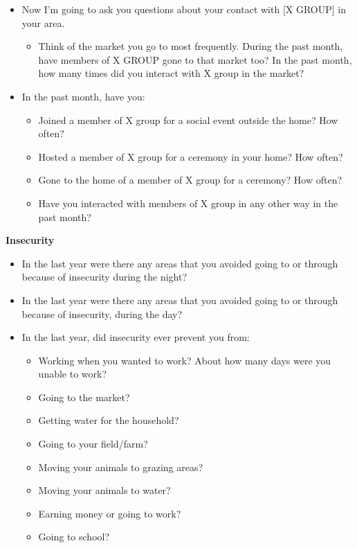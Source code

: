 \documentclass[
]{article}
\providecommand{\tightlist}{%
  \setlength{\itemsep}{0pt}\setlength{\parskip}{0pt}}
\begin{document}
\begin{itemize}
\tightlist
\item
  Now I'm going to ask you questions about your contact with {[}X
  GROUP{]} in your area.

  \begin{itemize}
  \tightlist
  \item
    Think of the market you go to most frequently. During the past
    month, have members of X GROUP gone to that market too? In the past
    month, how many times did you interact with X group in the market?
  \end{itemize}
\item
  In the past month, have you:

  \begin{itemize}
  \tightlist
  \item
    Joined a member of X group for a social event outside the home? How
    often?
  \item
    Hosted a member of X group for a ceremony in your home? How often?
  \item
    Gone to the home of a member of X group for a ceremony? How often?
  \item
    Have you interacted with members of X group in any other way in the
    past month?
  \end{itemize}
\end{itemize}

\textbf{Insecurity}

\begin{itemize}
\tightlist
\item
  In the last year were there any areas that you avoided going to or
  through because of insecurity during the night?
\item
  In the last year were there any areas that you avoided going to or
  through because of insecurity, during the day?
\item
  In the last year, did insecurity ever prevent you from:

  \begin{itemize}
  \tightlist
  \item
    Working when you wanted to work? About how many days were you unable
    to work?
  \item
    Going to the market?
  \item
    Getting water for the household?
  \item
    Going to your field/farm?
  \item
    Moving your animals to grazing areas?
  \item
    Moving your animals to water?
  \item
    Earning money or going to work?
  \item
    Going to school?
  \end{itemize}
\end{itemize}
\end{document}
